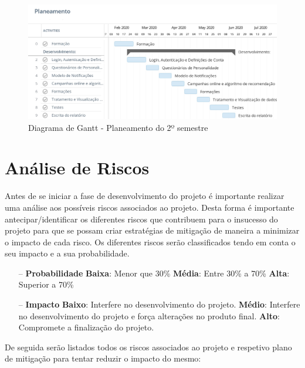 \newpage


\begin{figure}[ht!]
	\begin{center}
		\includegraphics[width=1\textwidth]{img/gantt/semestre2.jpeg}
		\caption{Diagrama de Gantt - Planeamento do 2º semestre}
		\label{fig:gantt2}
	\end{center}
\end{figure}


\section{Análise de Riscos}
\label{analiseriscos}

Antes de se iniciar a fase de desenvolvimento do projeto é importante realizar uma análise aos possíveis riscos associados ao projeto. Desta forma é importante antecipar/identificar os diferentes riscos que contribuem para o insucesso do projeto para que se possam criar estratégias de mitigação de maneira a minimizar o impacto de cada risco. Os diferentes riscos serão classificados tendo em conta o seu impacto e a sua probabilidade.

\begin{itemize}
	\item[--] \textbf{Probabilidade}
	\subitem \textbf{Baixa}: Menor que 30\%
	\subitem \textbf{Média}: Entre 30\% a 70\%
	\subitem \textbf{Alta}: Superior a 70\%
	\item[--] \textbf{Impacto}
	\subitem \textbf{Baixo}: Interfere no desenvolvimento do projeto.
	\subitem \textbf{Médio}: Interfere no desenvolvimento do projeto e força alterações no produto final.
	\subitem \textbf{Alto}: Compromete a finalização do projeto.
\end{itemize}

De seguida serão listados todos os riscos associados ao projeto e respetivo plano de mitigação para tentar reduzir o impacto do mesmo:

